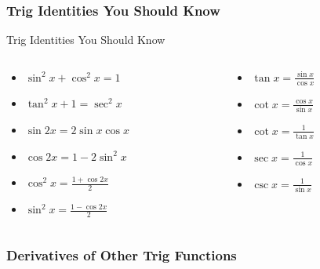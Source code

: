 \documentclass[cal1spr16Lectures.tex]{subfiles}
\begin{document}
\subsubsection{Trig Identities You Should Know}

\begin{frame}{\small Trig Identities You Should Know}
\begin{columns}[T]
\begin{column}{.5\textwidth}
\begin{itemize}\footnotesize
	\item $\sin^2 x + \cos^2 x = 1$ \vspace{0.2cm}
	\item $\tan^2 x + 1 = \sec^2 x$ \vspace{0.2cm}
	\item $\sin 2x =2\sin x \cos x$ \vspace{0.2cm}
	\item $\cos 2x = 1-2\sin^2 x$ \vspace{0.2cm}
	\item $\cos^2 x = \frac{1+\cos 2x}{2}$ \vspace{0.1cm}
	\item $\sin^2 x = \frac{1-\cos 2x}{2}$ \vspace{0.2cm}
\end{itemize}
\end{column}
\begin{column}{.5\textwidth}
\begin{itemize}\footnotesize
	\item $\tan x = \frac{\sin x}{\cos x}$ \vspace{0.2cm}
	\item $\cot x = \frac{\cos x}{\sin x}$ \vspace{0.2cm}
	\item $\cot x = \frac{1}{\tan x}$ \vspace{0.2cm}
	\item $\sec x = \frac{1}{\cos x}$ \vspace{0.1cm}
	\item $\csc x = \frac{1}{\sin x}$ \vspace{0.2cm}
\end{itemize}
\end{column}
\end{columns}
\end{frame}

\subsubsection{Derivatives of Other Trig Functions}
\end{document}
